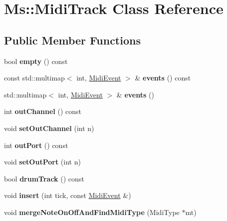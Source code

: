 \hypertarget{class_ms_1_1_midi_track}{}\section{Ms\+:\+:Midi\+Track Class Reference}
\label{class_ms_1_1_midi_track}
\subsection*{Public Member Functions}
\begin{DoxyCompactItemize}
\item 
\mbox{\label{class_ms_1_1_midi_track_ad63317df652b3fa1d3ce6dbce869064f}} 
bool {\bfseries empty} () const
\item 
\mbox{\label{class_ms_1_1_midi_track_a49093c0b3193ed8d5d3f0b0b8e0dc617}} 
const std\+::multimap$<$ int, \hyperlink{class_ms_1_1_midi_event}{Midi\+Event} $>$ \& {\bfseries events} () const
\item 
\mbox{\label{class_ms_1_1_midi_track_ab1557bd2e554269ecdb97b7860ba9ca6}} 
std\+::multimap$<$ int, \hyperlink{class_ms_1_1_midi_event}{Midi\+Event} $>$ \& {\bfseries events} ()
\item 
\mbox{\label{class_ms_1_1_midi_track_acc6f97fd1157dc46801dbb0df2a69a2d}} 
int {\bfseries out\+Channel} () const
\item 
\mbox{\label{class_ms_1_1_midi_track_ad69639bf7147d29237fde1131efd8341}} 
void {\bfseries set\+Out\+Channel} (int n)
\item 
\mbox{\label{class_ms_1_1_midi_track_aad040b93458fafea339972f4537387ac}} 
int {\bfseries out\+Port} () const
\item 
\mbox{\label{class_ms_1_1_midi_track_a09e929575b880959afba468672067fe8}} 
void {\bfseries set\+Out\+Port} (int n)
\item 
\mbox{\label{class_ms_1_1_midi_track_afb4c68c56f2702d3d0b2bc58c74585c8}} 
bool {\bfseries drum\+Track} () const
\item 
\mbox{\label{class_ms_1_1_midi_track_a5f34b06fc8e9d7c6b41f8df152c5dcc6}} 
void {\bfseries insert} (int tick, const \hyperlink{class_ms_1_1_midi_event}{Midi\+Event} \&)
\item 
\mbox{\label{class_ms_1_1_midi_track_a624706c894defc9817d446b83751ae21}} 
void {\bfseries merge\+Note\+On\+Off\+And\+Find\+Midi\+Type} (Midi\+Type $\ast$mt)
\end{DoxyCompactItemize}
